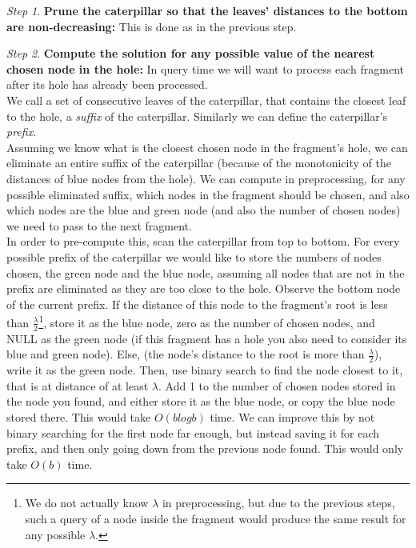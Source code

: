 \documentclass[11pt,a4paper]{article}
\theoremstyle{definition}
\theoremstyle{remark}
\newtheorem{step}{Step}[section]
\begin{document}
\begin{step}
\textbf{Prune the caterpillar so that the leaves' distances to the bottom are non-decreasing:} \label{making distances from the hole monotone}
This is done as in the previous step.
\end{step}
\begin{step}
\textbf{Compute the solution for any possible value of the nearest chosen node in the hole:}
In query time we will want to process each fragment after its hole has already been processed.\\
We call a set of consecutive leaves of the caterpillar, that contains the closest leaf to the hole, a \emph{suffix} of the caterpillar. Similarly we can define the caterpillar's \emph{prefix}.\\
Assuming we know what is the closest chosen node in the fragment's hole, we can eliminate an entire suffix of the caterpillar (because of the monotonicity of the distances of blue nodes from the hole). We can compute in preprocessing, for any possible eliminated suffix, which nodes in the fragment should be chosen, and also which nodes are the blue and green node (and also the number of chosen nodes) we need to pass to the next fragment.\\
In order to pre-compute this, scan the caterpillar from top to bottom. For every possible prefix of the caterpillar we would like to store the numbers of nodes chosen, the green node and the blue node, assuming all nodes that are not in the prefix are eliminated as they are too close to the hole. Observe the bottom node of the current prefix. If the distance of this node to the fragment's root is less than $\frac{\lambda}{2}$\footnote{We do not actually know $\lambda$ in preprocessing, but due to the previous steps, such a query of a node inside the fragment would produce the same result for any possible $\lambda$.}, store it as the blue node, zero as the number of chosen nodes, and NULL as the green node (if this fragment has a hole you also need to consider its blue and green node). Else, (the node's distance to the root is more than $\frac{\lambda}{2}$), write it as the green node. Then, use binary search to find the node closest to it, that is at distance of at least $\lambda$. Add 1 to the number of chosen nodes stored in the node you found, and either store it as the blue node, or copy the blue node stored there. This would take $O(blogb)$ time. We can improve this by not binary searching for the first node far enough, but instead saving it for each prefix, and then only going down from the previous node found. This would only take $O(b)$ time.
\end{step}
\end{document}
